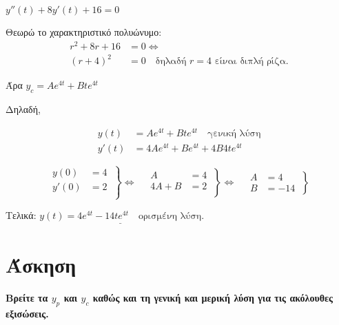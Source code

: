 \documentclass[a4paper,12pt]{article}
\begin{document}
\begin{description}
$y''(t)+8y'(t) + 16 = 0$

Θεωρώ το χαρακτηριστικό πολυώνυμο:
\begin{align*}
r^2+8r+16&=0 \Leftrightarrow \\
(r+4)^2&=0 \quad \text{δηλαδή $r=4$ είναι διπλή ρίζα}.
\end{align*}

Άρα $y_c=Ae^{4t} + Bte^{4t} $

Δηλαδή,

\begin{align*}
y(t) &= Ae^{4t} + Bte^{4t} \quad \text{γενική λύση} \\
y'(t) &= 4Ae^{4t} + Be^{4t} + 4B4te^{4t}
\end{align*}

\[
  \left.\begin{aligned}
y(0)&=4 \\
y'(0)&=2\\
  \end{aligned}\:\right\}\Leftrightarrow \quad
 \left.\begin{aligned}
A&=4\\
4A+B&=2\\
  \end{aligned}\:\right\}\Leftrightarrow \quad
 \left.\begin{aligned}
A&=4\\
B&=-14
  \end{aligned}\:\right\}
\]


Τελικά: $\underline{y(t) = 4e^{4t}-14te^{4t} \quad \text{ορισμένη λύση}}$.
\end{description}


\vspace{2\baselineskip}

\section{Άσκηση} {\bfseries Βρείτε τα $y_p$ και $y_c$ καθώς και τη γενική και μερική λύση για τις ακόλουθες εξισώσεις.}

\vspace{2\baselineskip}
\end{document}
